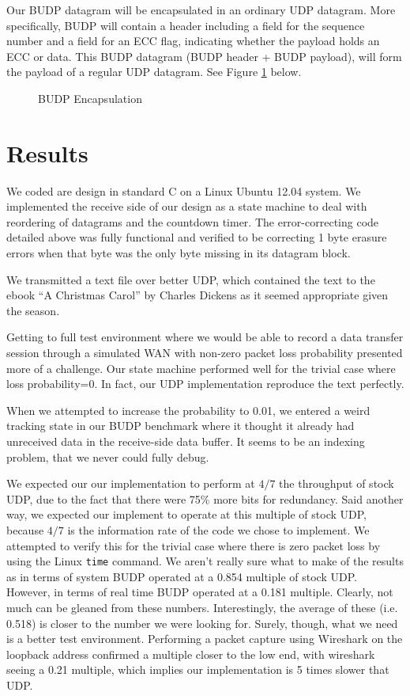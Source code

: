 \documentclass[conference]{IEEEtran}
\theoremstyle{definition}
\begin{document}
Our BUDP datagram will be encapsulated in an ordinary
UDP datagram.  More specifically, BUDP will contain a
header including a field for the sequence number and
a field for an ECC flag, indicating whether the
payload holds an ECC or data.  This BUDP datagram
(BUDP header + BUDP payload), will form the payload
of a regular UDP datagram.  See Figure \ref{budp_encap}
below.

\begin{figure}[h!]
\centering
\resizebox{0.45\textwidth}{!}{}
\caption{BUDP Encapsulation}
\label{budp_encap}
\end{figure}


\section{Results}
We coded are design in standard C on a Linux Ubuntu 12.04
system. We implemented the receive side of our design as a state
machine to deal with reordering of datagrams and the
countdown timer.  The error-correcting code detailed above
was fully functional and verified to be correcting 1 byte
erasure errors when that byte was the only byte missing
in its datagram block.

We transmitted a text file over better UDP, which contained
the text to the ebook ``A Christmas Carol'' by Charles Dickens
as it seemed appropriate given the season.

Getting to full test environment where
we would be able to record a data transfer session through
a simulated WAN with non-zero packet loss probability presented
more of a challenge.  Our state machine performed well
for the trivial case where loss probability=0.  In fact,
our UDP implementation reproduce the text perfectly.


When we attempted to increase the probability to 0.01, we entered
a weird tracking state in our BUDP benchmark where it thought
it already had unreceived data in the receive-side data buffer.
It seems to be an indexing problem, that we never could fully
debug.

We expected our our implementation to perform at
$4/7$ the throughput of stock UDP, due to the
fact that there were 75\% more bits for redundancy.
Said another way, we expected our implement to operate
at this multiple of stock UDP, because $4/7$ is the 
information rate of the code we chose to implement.
We attempted to verify this for the trivial case
where there is zero packet loss by using the Linux
\verb+time+ command.  We aren't really sure what to
make of the results as in terms of system BUDP
operated at a 0.854 multiple of stock UDP.  However,
in terms of real time BUDP operated at a 0.181 multiple.
Clearly, not much can be gleaned from these numbers.
Interestingly, the average of these (i.e. 0.518) is
closer to the number we were looking for.  Surely, though,
what we need is a better test environment. Performing a
packet capture using Wireshark on the loopback address
confirmed a multiple closer to the low end, with wireshark
seeing a 0.21 multiple, which implies our implementation
is 5 times slower that UDP.
\end{document}
